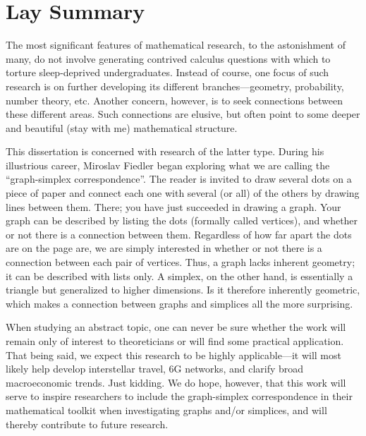 \chapter*{Lay Summary}

The  most  significant features of mathematical research, to the astonishment of  many, do not involve generating contrived  calculus  questions with which to torture sleep-deprived undergraduates. 
Instead of course, one focus of such research is on further developing  its different branches---geometry, probability, number theory, etc.  Another concern, however, is to seek connections between these different areas. Such  connections are elusive, but often point to some deeper and beautiful (stay with me) mathematical structure. 

This dissertation is concerned with research of the latter type. 
During his illustrious career, Miroslav Fiedler began exploring what we are calling the ``graph-simplex correspondence''. 
The  reader is invited  to draw several dots  on a piece of paper and connect each one with  several (or all) of the others by drawing  lines between them. There; you have  just succeeded in drawing a graph. Your graph can be  described  by listing the dots (formally  called vertices), and whether or not there is a  connection between  them. Regardless of how far  apart the dots  are on the page are, we are  simply interested in whether or not there is a  connection between each pair of vertices. Thus, a graph  lacks inherent  geometry; it  can  be described with  lists only. A simplex, on the other  hand, is essentially a triangle but generalized  to higher dimensions. Is it therefore inherently geometric, which makes a connection between graphs and simplices all the more surprising. 

When studying an abstract topic, one can never be  sure  whether the work will remain only of interest to theoreticians or will find some practical application. That being said, we expect this research to be highly applicable---it will most likely help develop interstellar travel, 6G networks, and clarify broad macroeconomic trends. Just kidding. We do hope, however, that this work will serve to inspire researchers to include the  graph-simplex correspondence in  their mathematical  toolkit when  investigating graphs and/or simplices, and will thereby contribute to future  research. 
 

